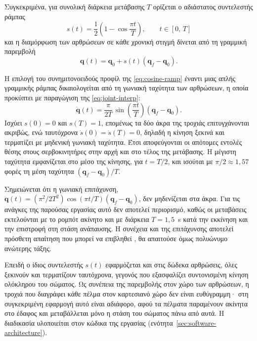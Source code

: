 \documentclass[11pt]{report}
\begin{document}
Συγκεκριμένα, για συνολική διάρκεια μετάβασης $T$ ορίζεται ο αδιάστατος
συντελεστής ράμπας
\begin{equation}
s(t) = \frac{1}{2}\left(1 - \cos\frac{\pi t}{T}\right), \qquad t \in [0,\,T]
\label{eq:cosine-ramp}
\end{equation}
και η διαμόρφωση των αρθρώσεων σε κάθε χρονική στιγμή δίνεται από τη γραμμική
παρεμβολή
\begin{equation}
\mathbf{q}(t) = \mathbf{q}_0 + s(t)\left(\mathbf{q}_f - \mathbf{q}_0\right).
\label{eq:joint-interp}
\end{equation}

Η επιλογή του συνημιτονοειδούς προφίλ της \eqref{eq:cosine-ramp} έναντι μιας
απλής γραμμικής ράμπας δικαιολογείται από τη γωνιακή ταχύτητα των αρθρώσεων,
η οποία προκύπτει με παραγώγιση της \eqref{eq:joint-interp}:
\begin{equation}
\dot{\mathbf{q}}(t) = \frac{\pi}{2T}\,\sin\!\left(\frac{\pi t}{T}\right)
\left(\mathbf{q}_f - \mathbf{q}_0\right).
\label{eq:joint-vel}
\end{equation}
Ισχύει $s(0) = 0$ και $s(T) = 1$, επομένως τα δύο άκρα της τροχιάς
επιτυγχάνονται ακριβώς, ενώ ταυτόχρονα $\dot{s}(0) = \dot{s}(T) = 0$, δηλαδή η
κίνηση ξεκινά και τερματίζει με μηδενική γωνιακή ταχύτητα. Έτσι αποφεύγονται οι
απότομες εντολές θέσης στους σερβοκινητήρες στην αρχή και στο τέλος της
μετάβασης. Η μέγιστη ταχύτητα εμφανίζεται στο μέσο της κίνησης, για $t = T/2$,
και ισούται με $\pi/2 \approx 1{,}57$ φορές τη μέση ταχύτητα
$(\mathbf{q}_f - \mathbf{q}_0)/T$.

Σημειώνεται ότι η γωνιακή επιτάχυνση, $\ddot{\mathbf{q}}(t) =
(\pi^2/2T^2)\cos(\pi t/T)(\mathbf{q}_f - \mathbf{q}_0)$, δεν μηδενίζεται στα
άκρα. Για τις ανάγκες της παρούσας εργασίας αυτό δεν αποτελεί περιορισμό, καθώς
οι μεταβάσεις εκτελούνται με το ρομπότ ακίνητο και με διάρκεια $T = 1{,}5$~s
κατά την εκκίνηση και την επιστροφή στη στάση ανάπαυσης. Η συνέχεια και της επιτάχυνσης αποτελεί πρόσθετη απαίτηση που
μπορεί να επιβληθεί \cite{siciliano_robotics_2009}, θα απαιτούσε όμως πολυώνυμο
ανώτερης τάξης.

Επειδή ο ίδιος συντελεστής $s(t)$ εφαρμόζεται και στις δώδεκα αρθρώσεις, όλες
ξεκινούν και τερματίζουν ταυτόχρονα, γεγονός που εξασφαλίζει συντονισμένη
κίνηση ολόκληρου του σώματος. Ως συνέπεια της παρεμβολής στον χώρο των
αρθρώσεων, η τροχιά που διαγράφει κάθε πέλμα στον καρτεσιανό χώρο δεν είναι
ευθύγραμμη· στη συγκεκριμένη εφαρμογή αυτό είναι αδιάφορο, αφού τα πέλματα
παραμένουν ακίνητα στο έδαφος και μεταβάλλεται μόνο η στάση του σώματος πάνω από
αυτά. Η διαδικασία υλοποιείται στον κώδικα της εργασίας
(ενότητα~\ref{sec:software-architecture}).
\end{document}
